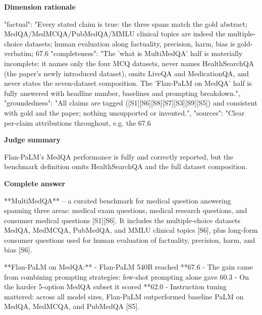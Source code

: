 \documentclass[10pt]{article}
\begin{document}
\textbf{Dimension rationale}
\begin{EvidenceText}
{
  "factual": "Every stated claim is true: the three spans match the gold abstract; MedQA/MedMCQA/PubMedQA/MMLU clinical topics are indeed the multiple-choice datasets; human evaluation along factuality, precision, harm, bias is gold-verbatim; 67.6%
  "completeness": "The 'what is MultiMedQA' half is materially incomplete: it names only the four MCQ datasets, never names HealthSearchQA (the paper's newly introduced dataset), omits LiveQA and MedicationQA, and never states the seven-dataset composition. The 'Flan-PaLM on MedQA' half is fully answered with headline number, baselines and prompting breakdown.",
  "groundedness": "All claims are tagged ([S1][S6][S8][S7][S3][S9][S5]) and consistent with gold and the paper; nothing unsupported or invented.",
  "sources": "Clear per-claim attributions throughout, e.g. the 67.6%
}
\end{EvidenceText}

\textbf{Judge summary}
\begin{EvidenceText}
Flan-PaLM's MedQA performance is fully and correctly reported, but the benchmark definition omits HealthSearchQA and the full dataset composition.
\end{EvidenceText}

\textbf{Complete answer}
\begin{AnswerText}
**MultiMedQA** -- a curated benchmark for medical question answering spanning three areas: medical exam questions, medical research questions, and consumer medical questions [S1][S6]. It includes the multiple-choice datasets MedQA, MedMCQA, PubMedQA, and MMLU clinical topics [S6], plus long-form consumer questions used for human evaluation of factuality, precision, harm, and bias [S6].

**Flan-PaLM on MedQA:**
- Flan-PaLM 540B reached **67.6%
- The gain came from combining prompting strategies: few-shot prompting alone gave 60.3%
- On the harder 5-option MedQA subset it scored **62.0%
- Instruction tuning mattered: across all model sizes, Flan-PaLM outperformed baseline PaLM on MedQA, MedMCQA, and PubMedQA [S5].
\end{AnswerText}
\end{document}
